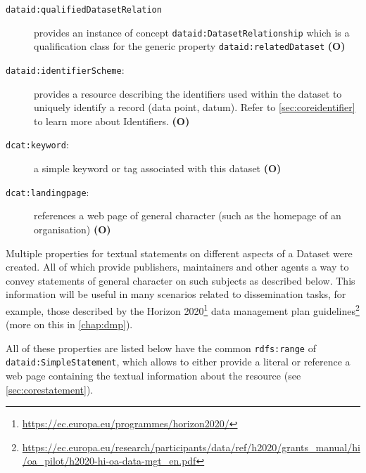 \documentclass[a4paper,english,twoside,BCOR1.5cm,headsepline,DIV12,appendixprefix,final,12pt]{scrbook}
\newcommand{\prop}[1]{{{\texttt{#1}}}}
\newcommand\footnoteurl[1]{\footnote{\scriptsize\url{#1}}}
\begin{document}
\begin{description}
\item[\prop{dataid:qualifiedDatasetRelation}] provides an instance of concept \prop{dataid:DatasetRelationship} which is a qualification class for the generic property \prop{dataid:relatedDataset} \textbf{(O)}
\item[\prop{dataid:identifierScheme}:] provides a resource describing the identifiers used within the dataset to uniquely identify a record (data point, datum). Refer to \cref{sec:coreidentifier} to learn more about Identifiers. \textbf{(O)}
\item[\prop{dcat:keyword}:] a simple keyword or tag associated with this dataset \textbf{(O)}
\item[\prop{dcat:landingpage}:] references a web page of general character (such as the homepage of an organisation) \textbf{(O)}
\end{description}

Multiple properties for textual statements on different aspects of a Dataset were created. All of which provide publishers, maintainers and other agents a way to convey statements of general character on such subjects as described below. This information will be useful in many scenarios related to dissemination tasks, for example, those described by the Horizon 2020\footnoteurl{https://ec.europa.eu/programmes/horizon2020/} data management plan guidelines\footnoteurl{https://ec.europa.eu/research/participants/data/ref/h2020/grants_manual/hi/oa_pilot/h2020-hi-oa-data-mgt_en.pdf} (more on this in \cref{chap:dmp}).

All of these properties are listed below have the common \prop{rdfs:range} of \prop{dataid:SimpleStatement}, which allows to either provide a literal or reference a web page containing the textual information about the resource (see \cref{sec:corestatement}). 
\end{document}
